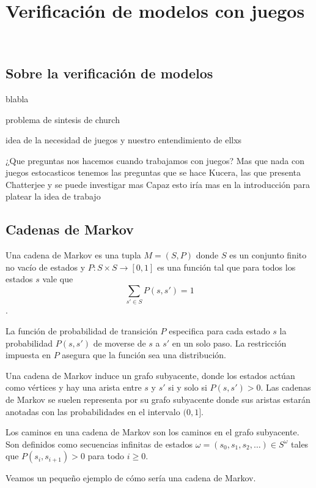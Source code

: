 \chapter{Verificación de modelos con juegos}
~\label{cap:approach}

\section{Sobre la verificación de modelos}

blabla

problema de sintesis de church

idea de la necesidad de juegos y nuestro entendimiento de ellxs

¿Que preguntas nos hacemos cuando trabajamos con juegos? Mas que nada con juegos estocasticos
tenemos las preguntas que se hace Kucera, las que presenta Chatterjee y se puede investigar mas
Capaz esto iría mas en la introducción para platear la idea de trabajo

\section{Cadenas de Markov}

\begin{definition}
	Una cadena de Markov es una tupla $M = (S, P)$ donde $S$ es un conjunto finito no vacío de estados y $P: S \times S \rightarrow [0,1]$ es una función tal que para todos los estados $s$ vale que
	$$ \sum_{s' \in S} P(s, s') = 1$$.
\end{definition}

La función de probabilidad de transición $P$ especifica para cada estado $s$ la
probabilidad $P(s, s')$ de moverse de $s$ a $s'$ en un solo paso. La
restricción impuesta en $P$ asegura que la función sea una distribución.

Una cadena de Markov induce un grafo subyacente, donde los estados actúan como
vértices y hay una arista entre $s$ y $s'$ si y solo si $P(s, s') > 0$. Las
cadenas de Markov se suelen representa por su grafo subyacente donde sus
aristas estarán anotadas con las probabilidades en el intervalo $(0, 1]$.

Los caminos en una cadena de Markov son los caminos en el grafo subyacente. Son
definidos como secuencias infinitas de estados $\omega = (s_0, s_1, s_2, \dots)
	\in S^\omega$ tales que $P(s_i, s_{i+1}) > 0 $ para todo $i \geq 0$.

Veamos un pequeño ejemplo de cómo sería una cadena de Markov.

